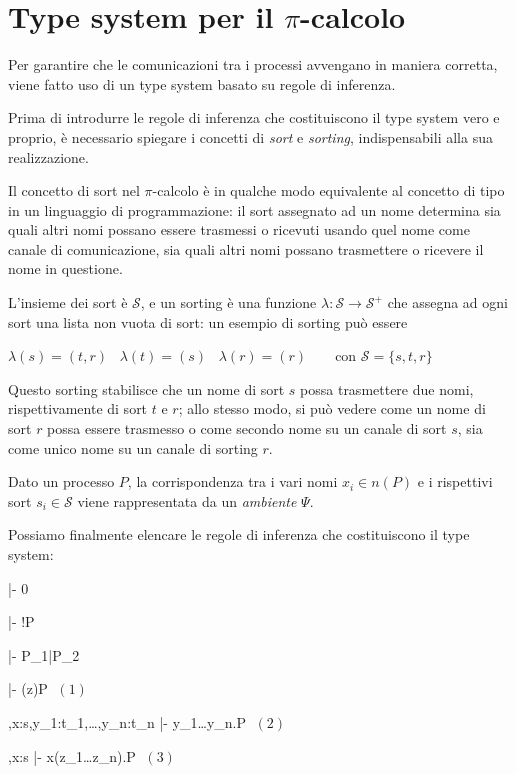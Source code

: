 \section{Type system per il \texorpdfstring{$\pi$}{pi}-calcolo}

Per garantire che le comunicazioni tra i processi avvengano in maniera
corretta, viene fatto uso di un type system basato su regole di
inferenza\cite{qw05}.

Prima di introdurre le regole di inferenza che costituiscono il type system
vero e proprio, \`e necessario spiegare i concetti di \emph{sort} e
\emph{sorting}, indispensabili alla sua realizzazione.

Il concetto di sort nel $\pi$-calcolo \`e in qualche modo equivalente al
concetto di tipo in un linguaggio di programmazione: il sort assegnato ad un
nome determina sia quali altri nomi possano essere trasmessi o ricevuti usando
quel nome come canale di comunicazione, sia quali altri nomi possano
trasmettere o ricevere il nome in questione.

L'insieme dei sort \`e $\mathcal{S}$, e un sorting \`e una funzione
$\lambda : \mathcal{S} \rightarrow \mathcal{S}^{+}$ che assegna ad ogni sort
una lista non vuota di sort: un esempio di sorting pu\`o essere

\begin{pilisting}
$
    \lambda(s) = (t,r) \;\;\;
    \lambda(t) = (s)   \;\;\;
    \lambda(r) = (r)   \;\;\;\;\;\;
$
con $\mathcal{S} = \{s,t,r\}$
\end{pilisting}

Questo sorting stabilisce che un nome di sort $s$ possa trasmettere due
nomi, rispettivamente di sort $t$ e $r$; allo stesso modo, si pu\`o vedere
come un nome di sort $r$ possa essere trasmesso o come secondo nome su un
canale di sort $s$, sia come unico nome su un canale di sorting $r$.

Dato un processo $P$, la corrispondenza tra i vari nomi $x_i \in n(P)$ e
i rispettivi sort $s_i \in \mathcal{S}$ viene rappresentata da un
\emph{ambiente} $\Psi$.

Possiamo finalmente elencare le regole di inferenza che costituiscono il
type system:

\begin{pilisting}
\inference[nil ]
  {}
  {\Psi |- 0}

\vspace{3mm}
\indent
{}
  {\Psi |- !P}

\vspace{3mm}
\indent
{}
  {\Psi |- P_1|P_2}

\vspace{3mm}
\indent
{}
  {\Psi |- (z)P}
$\; (1)$

\vspace{3mm}
\indent
{}
  {\Psi,x:s,y_1:t_1,\ldots,y_n:t_n |- \langle y_1\ldots y_n\rangle.P}
$\; (2)$

\vspace{3mm}
\indent
{}
  {\Psi,x:s |- x(z_1\ldots z_n).P}
$\; (3)$
\end{pilisting}

